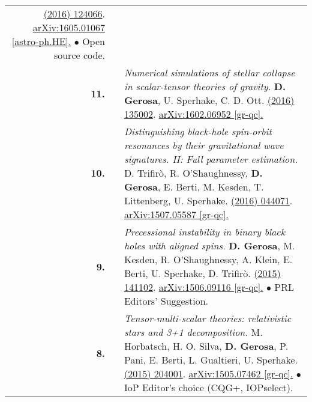 {\begin{longtable}{rp{0.3cm}p{15.8cm}}
\href{http://dx.doi.org/10.1103/PhysRevD.93.124066}{\prd 93 (2016) 124066}. \href{https://arxiv.org/abs/1605.01067}{arXiv:1605.01067 [astro-ph.HE].}
\newline{}
\textcolor{color1}{$\bullet$} Open source code.
\vspace{0.09cm}\\
%
\textbf{11.} & & \textit{Numerical simulations of stellar collapse in scalar-tensor theories of gravity.}
\newline{}
\textbf{D. Gerosa}, U. Sperhake, C. D. Ott.
\newline{}
\href{http://dx.doi.org/10.1088/0264-9381/33/13/135002}{\cqg 33 (2016) 135002}. \href{https://arxiv.org/abs/1602.06952}{arXiv:1602.06952 [gr-qc].}
\vspace{0.09cm}\\
%
\textbf{10.} & & \textit{Distinguishing black-hole spin-orbit resonances by their gravitational wave signatures. II: Full parameter estimation.}
\newline{}
D. Trifir\`o, R. O'Shaughnessy, \textbf{D. Gerosa}, E. Berti, M. Kesden, T. Littenberg, U. Sperhake.
\newline{}
\href{http://dx.doi.org/10.1103/PhysRevD.93.044071}{\prd 93 (2016) 044071}. \href{https://arxiv.org/abs/1507.05587}{arXiv:1507.05587 [gr-qc].}
\vspace{0.09cm}\\
%
\textbf{9.} & & \textit{Precessional instability in binary black holes with aligned spins.}
\newline{}
\textbf{D. Gerosa}, M. Kesden, R. O'Shaughnessy, A. Klein, E. Berti, U. Sperhake, D. Trifir\`o.
\newline{}
\href{http://dx.doi.org/10.1103/PhysRevLett.115.141102}{\prl 115 (2015) 141102}. \href{https://arxiv.org/abs/1506.09116}{arXiv:1506.09116 [gr-qc].}
\newline{}
\textcolor{color1}{$\bullet$} PRL Editors' Suggestion.
\vspace{0.09cm}\\
%
\textbf{8.} & & \textit{Tensor-multi-scalar theories: relativistic stars and 3+1 decomposition.}
\newline{}
M. Horbatsch, H. O. Silva, \textbf{D. Gerosa}, P. Pani,  E. Berti, L. Gualtieri, U. Sperhake.
\newline{}
\href{http://dx.doi.org/10.1088/0264-9381/32/20/204001}{\cqg 32 (2015) 204001}. \href{https://arxiv.org/abs/1505.07462}{arXiv:1505.07462 [gr-qc].}
\newline{}
\textcolor{color1}{$\bullet$} IoP Editor's choice (CQG+, IOPselect).

\end{longtable}}
